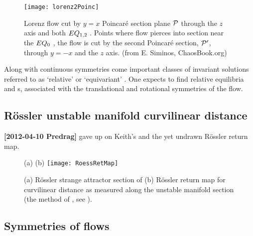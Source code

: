 \begin{figure}
   \centering
\texttt{[image: lorenz2Poinc]}
   \caption{
Lorenz flow cut by  $y=x$ Poincar\'e section plane ${\cal P}$ through the
$z$ axis and both $EQ_{1,2}$ \eqva. Points where flow pierces into
section %
near the $EQ_{0}$ \eqv, the flow is cut by the second Poincar\'e
section,  ${\cal P}'$, through $y=-x$ and the $z$ axis.
\hfill (from E. Siminos, ChaosBook.org)
} \label{fig:LorenzSect}
\end{figure}


Along with continuous symmetries come important classes of invariant
solutions referred to as `relative' or `equivariant'
. One expects to find relative
equilibria and \rpo s, associated with the translational
and rotational symmetries of the flow.


\subsection{R\"ossler unstable manifold curvilinear distance}

{\bf [2012-04-10 Predrag]} gave up on Keith's 
and the yet undrawn {R\"ossler return map}.

\begin{figure}
\begin{center}
(a) %
(b) \texttt{[image: RoessRetMap]}
\end{center}
  \caption{
(a) R\"ossler strange attractor section of 
(b) R\"ossler return map for curvilinear distance as measured
along the unstable manifold section (the method of
, see ).
  }
\label{fig:RoessRetMap}
\end{figure}



\subsection{Symmetries of flows}
\label{s:symmFL}

